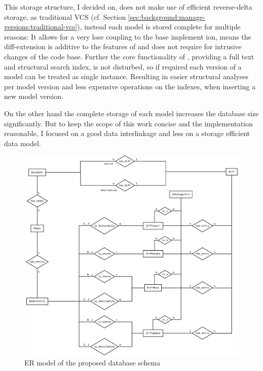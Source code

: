 This storage structure, I decided on, does not make use of efficient reverse-delta storage, as traditional VCS (cf. Section \ref{sec:background:manage-versions:traditional-vcs}), instead each model is stored complete for multiple reasons: It allows for a very lose coupling to the base \masymos implement ion, means the diff-extension is additive to the features of \masymos and does not require for intrusive changes of the code base. Further the core functionality of \masymos, providing a full text and structural search index, is not disturbed, so if required each version of a model can be treated as single instance. Resulting in easier structural analyses per model version and less expensive operations on the indexes, when inserting a new model version.

On the other hand the complete storage of each model increases the database size significantly. But to keep the scope of this work concise and the implementation reasonable, I focused on a good data interlinkage and less on a storage efficient data model. 
\begin{figure}
	\centering
	\includegraphics[width=\textwidth]{resources/db-concept-er.pdf}
	\caption{ER model of the proposed database schema}
	\label{fig:db-er-model}
\end{figure}


